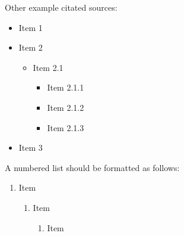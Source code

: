 \documentclass{iitsrc}
\begin{document}
\begin{multicols}{2}
Other example citated
sources:~\cite{CHS03RR,friedman:switching,henessy:computer,henrio:thesis,MannaPnueli82,MisraChandy,OwickiGries76b,vardhan98distributed,WidomPanangaden,C99-draft,czarnecki:generative-programming,SWIG,leiserson:network}
%
\begin{itemize}
\item Item 1
\item Item 2
    \begin{itemize}
    \item Item 2.1
        \begin{itemize}
        \item Item 2.1.1
        \item Item 2.1.2
        \item Item 2.1.3
        \end{itemize}
    \end{itemize}
\item Item 3
\end{itemize}
%
A numbered list should be formatted as follows:
%
\begin{enumerate}
\item Item
    \begin{enumerate}
    \item Item
        \begin{enumerate}
        \item Item
        \end{enumerate}
    \end{enumerate}
\end{enumerate}
%


\let\OLDthebibliography\thebibliography
\renewcommand\thebibliography[1]{
  \OLDthebibliography{#1}
  \setlength{\parskip}{5pt}
 \footnotesize
}




\end{multicols}
\end{document}

